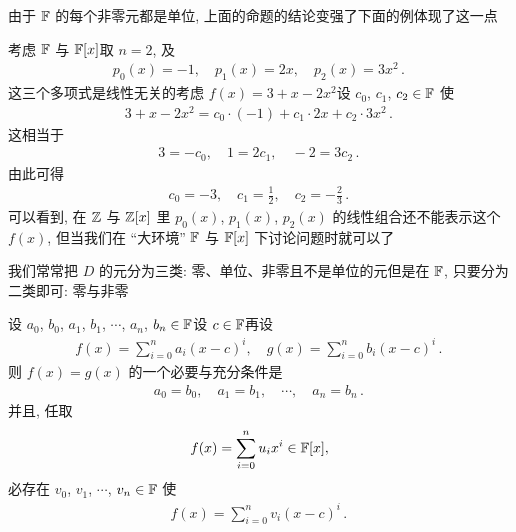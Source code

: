 由于 $\mathbb{F}$ 的每个非零元都是单位, 上面的命题的结论变强了\period 下面的例体现了这一点\period

\begin{example}
    考虑 $\mathbb{F}$ 与 $\mathbb{F}[x]$\period 取 $n=2$, 及
    \begin{align*}
        p_0 (x) = -1, \quad p_1 (x) = 2x, \quad p_2 (x) = 3x^2 \period
    \end{align*}
    这三个多项式是线性无关的\period 考虑 $f(x) = 3 + x - 2x^2$\period 设 $c_0$, $c_1$, $c_2 \in \mathbb{F}$ 使
    \begin{align*}
        3 + x - 2x^2 = c_0 \cdot (-1) + c_1 \cdot 2x + c_2 \cdot 3x^2 \period
    \end{align*}
    这相当于
    \begin{align*}
        3 = -c_0, \quad 1 = 2c_1, \quad -2 = 3c_2 \period
    \end{align*}
    由此可得
    \begin{align*}
        c_0 = -3, \quad c_1 = \frac12, \quad c_2 = -\frac23 \period
    \end{align*}
    可以看到, 在 $\mathbb{Z}$ 与 $\mathbb{Z}[x]$ 里 $p_0 (x)$, $p_1 (x)$, $p_2 (x)$ 的线性组合还不能表示这个 $f(x)$, 但当我们在 ``大环境'' $\mathbb{F}$ 与 $\mathbb{F}[x]$ 下讨论问题时就可以了\period
\end{example}

\begin{remark}
    我们常常把 $D$ 的元分为三类: 零、单位、非零且不是单位的元\period 但是在 $\mathbb{F}$, 只要分为二类即可: 零与非零\period
\end{remark}

\begin{proposition}
    设 $a_0$, $b_0$, $a_1$, $b_1$, $\cdots$, $a_n$, $b_n \in \mathbb{F}$\period 设 $c \in \mathbb{F}$\period 再设
    \begin{align*}
        f(x) = \sum_{i = 0}^n a_i (x-c)^i, \quad g(x) = \sum_{i = 0}^n b_i (x-c)^i \period
    \end{align*}
    则 $f(x)=g(x)$ 的一个必要与充分条件是
    \begin{align*}
        a_0 = b_0, \quad a_1 = b_1, \quad \cdots, \quad a_n = b_n \period
    \end{align*}
    并且, 任取
    \begin{align*}
        f(x) = \sum_{i = 0}^n u_i x^i \in \mathbb{F}[x],
    \end{align*}
    必存在 $v_0$, $v_1$, $\cdots$, $v_n \in \mathbb{F}$ 使
    \begin{align*}
        f(x) = \sum_{i = 0}^n v_i (x-c)^i \period
    \end{align*}
\end{proposition}

